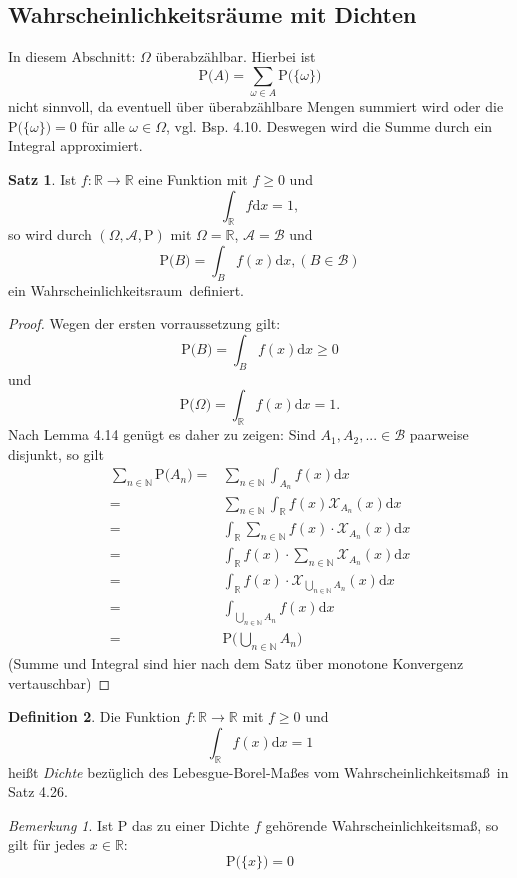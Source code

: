 \documentclass[a4paper,12pt,fleqn]{scrartcl}
\newcommand{\N}{\mathbb{N}}
\newcommand{\R}{\mathbb{R}}
\newcommand{\m}[1]{\mathcal{ #1 }}
\newcommand{\prob}[1]{\text{P(} #1 \text{)}}
\newcommand{\WR}{Wahrscheinlichkeitsraum}
\newcommand{\WM}{Wahrscheinlichkeitsmaß}
\theoremstyle{definition}
\newtheorem{definition}{Definition}[section]
\newtheorem{satz}[definition]{Satz}
\theoremstyle{plain}
\theoremstyle{remark}
\newtheorem*{bemerkung}{Bemerkung}
\begin{document}
\subsection{Wahrscheinlichkeitsräume mit Dichten}
In diesem Abschnitt: $\Omega$ überabzählbar.
Hierbei ist
\[\prob{A}=\sum_{\omega\in A}\prob{\{\omega\}}\]
nicht sinnvoll, da eventuell über überabzählbare Mengen summiert wird oder die $\prob{\{\omega\}}=0$ für alle $\omega\in\Omega$, vgl. Bsp. 4.10. Deswegen wird die Summe durch ein Integral approximiert.
\begin{satz}
Ist $f:\R\to\R$ eine Funktion mit $f\geq 0$ und 
\begin{equation*}
\int_{\R}f\mathrm{d}x=1,
\end{equation*}
so wird durch $(\Omega,\m{A},\text{P})$ mit $\Omega=\R$, $\m{A}=\m{B}$ und
\begin{equation*}
\prob{B}=\int_{B}f(x)\mathrm{d}x,(B\in\m{B})
\end{equation*}
ein \WR \, definiert.
\end{satz}
\begin{proof}
Wegen der ersten vorraussetzung gilt:
\[\prob{B}=\int_Bf(x)\mathrm{d}x\geq 0\]
und
\[\prob{\Omega}=\int_{\R}f(x)\mathrm{d}x=1.\]
Nach Lemma 4.14 genügt es daher zu zeigen: Sind $A_1,A_2,...\in \m{B}$ paarweise disjunkt, so gilt
\begin{align*}
\sum_{n\in\N}\prob{A_n}=&\sum_{n\in\N}\int_{A_n}f(x)\mathrm{d}x\\
=&\sum_{n\in\N}\int_{\R}f(x)\m{X}_{A_n}(x)\mathrm{d}x\\
=&\int_{\R}\sum_{n\in\N}f(x)\cdot\m{X}_{A_n}(x)\mathrm{d}x\\
=&\int_{\R}f(x)\cdot\sum_{n\in\N}\m{X}_{A_n}(x)\mathrm{d}x\\
=&\int_{\R}f(x)\cdot\m{X}_{\bigcup_{n\in\N}A_n}(x)\mathrm{d}x\\
=&\int_{\bigcup_{n\in\N}A_n}f(x)\mathrm{d}x\\
=&\prob{\bigcup_{n\in\N}A_n}
\end{align*}
(Summe und Integral sind hier nach dem Satz über monotone Konvergenz vertauschbar)
\end{proof}
\begin{definition}
Die Funktion $f:\R\to\R$ mit $f\geq 0$ und
\[\int_{\R}f(x)\mathrm{d}x=1\]
heißt \emph{Dichte} bezüglich des Lebesgue-Borel-Maßes vom \WM \, in Satz 4.26.
\end{definition}
\begin{bemerkung}
Ist P das zu einer Dichte $f$ gehörende \WM, so gilt für jedes $x\in\R$:
\[\prob{\{ x\}}=0\]
\end{bemerkung}
\end{document}
